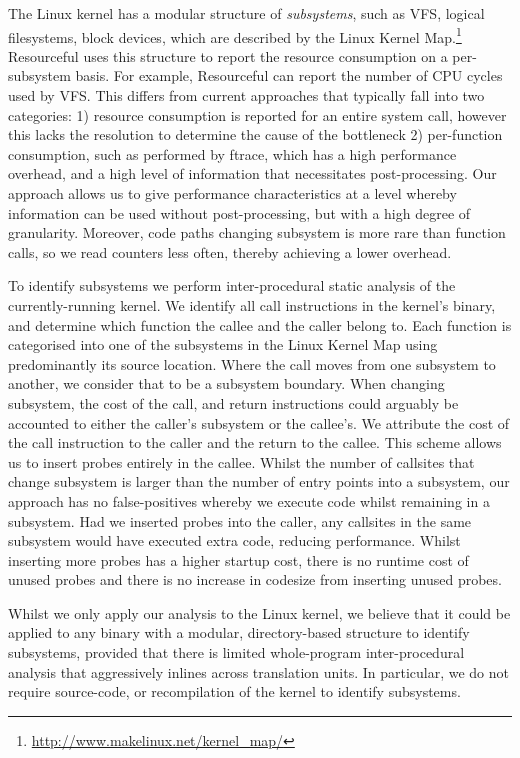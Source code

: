 \documentclass[letterpaper,twocolumn,10pt]{article}
\newcommand{\pname}{Resourceful}
\begin{document}
The Linux kernel has a modular structure of \emph{subsystems}, such as VFS,
logical filesystems, block devices, which are described by the Linux Kernel
Map.\footnote{\url{http://www.makelinux.net/kernel_map/}} \pname{ } uses this
structure to report the resource consumption on a per-subsystem basis. For
example, \pname{ } can report the number of CPU cycles used by VFS. This differs
from current approaches that typically fall into two categories: 1) resource
consumption is reported for an entire system call, however this lacks the
resolution to determine the cause of the bottleneck 2) per-function consumption,
such as performed by ftrace, which has a high performance overhead, and a high
level of information that necessitates post-processing. Our approach allows us
to give performance characteristics at a level whereby information can be used
without post-processing, but with a high degree of granularity. Moreover, code
paths changing subsystem is more rare than function calls, so we read counters
less often, thereby achieving a lower overhead.

To identify subsystems we perform inter-procedural static analysis of the
currently-running kernel. We identify all call instructions in the kernel's
binary, and determine which function the callee and the caller belong to. Each
function is categorised into one of the subsystems in the Linux Kernel Map using
predominantly its source location. Where the call moves from one subsystem to
another, we consider that to be a subsystem boundary. When changing subsystem,
the cost of the call, and return instructions could arguably be accounted to
either the caller's subsystem or the callee's. We attribute the cost of the call
instruction to the caller and the return to the callee. This scheme allows us to
insert probes entirely in the callee. Whilst the number of callsites that change
subsystem is larger than the number of entry points into a subsystem, our
approach has no false-positives whereby we execute code whilst remaining in a
subsystem. Had we inserted probes into the caller, any callsites in the same
subsystem would have executed extra code, reducing performance. Whilst inserting
more probes has a higher startup cost, there is no runtime cost of unused probes
and there is no increase in codesize from inserting unused probes.


Whilst we only apply our analysis to the Linux kernel, we believe that it could
be applied to any binary with a modular, directory-based structure to identify
subsystems, provided that there is limited whole-program inter-procedural
analysis that aggressively inlines across translation units. In particular, we
do not require source-code, or recompilation of the kernel to identify
subsystems.
\end{document}
